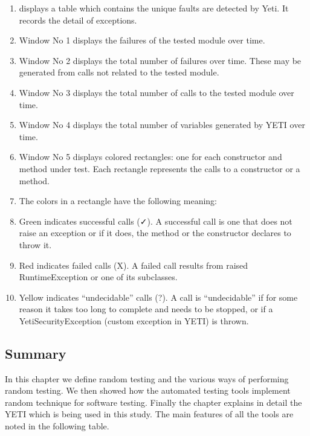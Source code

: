 \begin{enumerate}
\item displays a table which contains the unique faults are detected by Yeti. It records the detail of exceptions.
\item Window No 1 displays the failures of the tested module over time.
\item Window No 2 displays the total number of failures over time. These may be generated from calls not related to the tested module.
\item Window No 3 displays the total number of calls to the tested module over time. 
\item Window No 4 displays the total number of variables generated by YETI over time.
\item Window No 5 displays colored rectangles: one for each constructor and method under test. Each rectangle represents the calls to a constructor or a method.
\item The colors in a rectangle have the following meaning:
\item Green indicates successful calls (✓). A successful call is one that does not raise an exception or if it does, the method or the constructor declares to throw it.
\item Red indicates failed calls (X). A failed call results from raised RuntimeException or one of its subclasses.
\item Yellow indicates “undecidable” calls (?). A call is “undecidable” if for some reason it takes too long to complete and needs to be stopped, or if a YetiSecurityException (custom exception in YETI) is thrown.
\end{enumerate}


\subsection{Summary}
In this chapter we define random testing and the various ways of performing random testing. We then showed how the automated testing tools implement random technique for software testing. Finally the chapter explains in detail the YETI which is being used in this study. The main features of all the tools are noted in the following table.

